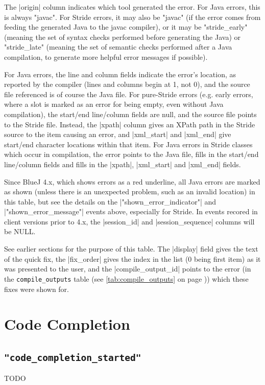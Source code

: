 \documentclass{report}
\newcommand{\myref}[1]{\autoref{#1} on page \pageref*{#1}}
\newcommand{\tabref}[1]{\lstinline|#1| table (see \myref{tab:#1})}
\begin{document}
The |origin| column indicates which tool generated the error.  For Java errors, this
is always "javac".  For Stride errors, it may also be "javac" (if the error comes from
feeding the generated Java to the javac compiler), or it may be "stride_early" (meaning the
set of syntax checks performed before generating the Java) or "stride_late" (meaning the
set of semantic checks performed after a Java compilation, to generate more helpful
error messages if possible).

For Java errors, the line and column fields indicate the error's location, as reported by the
compiler  (lines and columns begin at 1, not 0), and the source file referenced is of
course the Java file.  For pure-Stride errors (e.g. early errors, where a slot is marked as
an error for being empty, even without Java compilation), the start/end line/column fields
are null, and the source file points to the Stride file.  Instead, the |xpath| column
gives an XPath path in the Stride source to the item causing an error, and |xml_start| and |xml_end|
give start/end character locations within that item.  For Java errors in Stride classes which
occur in compilation, the error points to the Java file, fills in the start/end line/column fields
and fills in the |xpath|, |xml_start| and |xml_end| fields.

Since BlueJ 4.x, which shows errors as a red underline, all Java errors are marked
as shown (unless there is an unexpected problem, such as an invalid location) in
this table, but see the details on the |"shown_error_indicator"| and
|"shown_error_message"| events above, especially for Stride.  In events recored in client versions prior to 4.x,
the |session_id| and |session_sequence| columns will be NULL.


See earlier sections for the purpose of this table.  The |display| field gives the text of the
quick fix, the |fix_order| gives the index in the list (0 being first item) as it was presented
to the user, and the |compile_output_id| points to the error (in the \tabref{compile_outputs})
which these fixes were shown for.

\section{Code Completion}

\subsection{\lstinline!"code_completion_started"!} TODO
\end{document}
